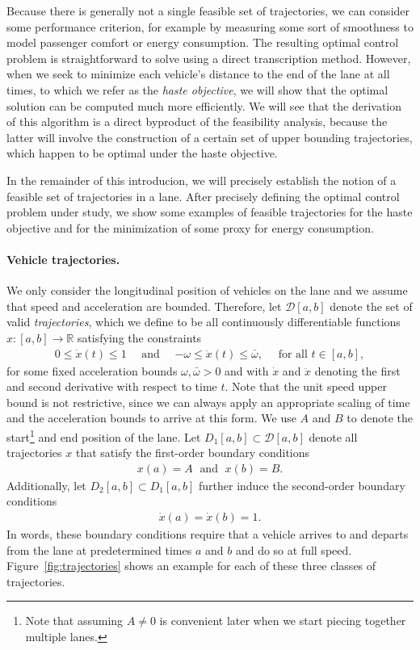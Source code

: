 \documentclass[a4paper]{article}
\theoremstyle{definition}
\theoremstyle{plain}
\begin{document}
Because there is generally not a single feasible set of trajectories, we can
consider some performance criterion, for example by measuring some sort of
smoothness to model passenger comfort or energy consumption.
%
The resulting optimal control problem is straightforward to solve using a direct
transcription method.
%
However, when we seek to minimize each vehicle's distance
to the end of the lane at all times, to which we refer as the \emph{haste
  objective}, we will show that the optimal solution can be computed much more
efficiently.
%
We will see that the derivation of this algorithm is a direct byproduct of the
feasibility analysis, because the latter will involve the construction of a
certain set of upper bounding trajectories, which happen to be optimal under the
haste objective.

In the remainder of this introducion, we will precisely establish the notion of
a feasible set of trajectories in a lane. After precisely defining the optimal
control problem under study, we show some examples of feasible trajectories for
the haste objective and for the minimization of some proxy for energy
consumption.


\paragraph{Vehicle trajectories.}
We only consider the longitudinal position of vehicles on the lane and we assume
that speed and acceleration are bounded. Therefore, let $\mathcal{D}[a,b]$
denote the set of valid \emph{trajectories}, which we define to be all continuously
differentiable functions $x : [a,b] \rightarrow \mathbb{R}$ satisfying the constraints
\begin{align}
  0 \leq \dot{x}(t) \leq 1 \quad \text{ and } \quad
  {-\omega} \leq \ddot{x}(t) \leq \bar{\omega} , \quad \text{ for all } t \in [a,b] ,
\end{align}
for some fixed acceleration bounds $\omega, \bar{\omega} > 0$ and with $\dot{x}$ and
$\ddot{x}$ denoting the first and second derivative with respect to time $t$.
Note that the unit speed upper bound is not restrictive, since we can always
apply an appropriate scaling of time and the acceleration bounds to arrive at
this form.
%
We use $A$ and $B$ to denote the start\footnote{Note that assuming $A\neq 0$ is convenient later when we start piecing together multiple lanes.} and end position of the lane.
%
Let $D_{1}[a, b] \subset \mathcal{D}[a, b]$ denote all trajectories $x$ that satisfy
the first-order boundary conditions
\begin{align}
  x(a) = A \; \text{ and } \; x(b) = B .
\end{align}
Additionally, let $D_{2}[a,b] \subset D_{1}[a, b]$ further induce the second-order
boundary conditions
\begin{align}
  \dot{x}(a) = \dot{x}(b) = 1 .
\end{align}
In words, these boundary conditions require that a vehicle arrives to and
departs from the lane at predetermined times $a$ and $b$ and do so at full
speed.
%
Figure~\ref{fig:trajectories} shows an example for each of these three classes of trajectories.
\end{document}
